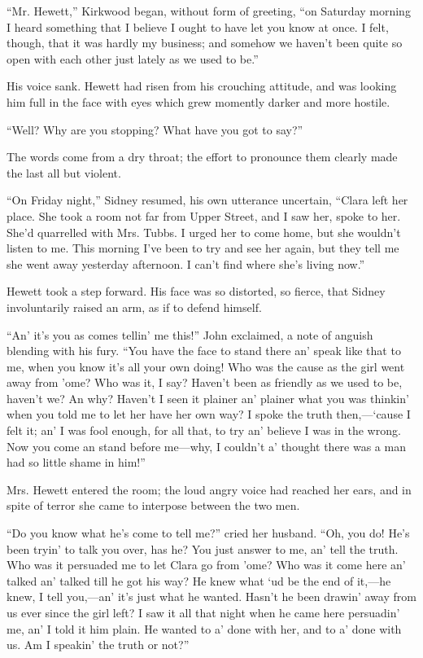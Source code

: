 ``Mr. Hewett,'' Kirkwood began, without form of greeting, ``on Saturday
morning I heard something that I believe I ought to have let you know at
once. I felt, though, that it was hardly my business; and somehow we
haven't been quite so open with each other just lately as we used to
be.''

His voice sank. Hewett had risen from his crouching attitude, and was
looking him full in the face with eyes which grew momently darker and
more hostile.

{}``Well? Why are you stopping? What have you got to say?''

The words come from a dry throat; the effort to pronounce them clearly
made the last all but violent.

``On Friday night,'' Sidney resumed, his own utterance uncertain,
``Clara left her place. She took a room not far from Upper Street, and I
saw her, spoke to her. She'd quarrelled with Mrs. Tubbs. I urged her to
come home, but she wouldn't listen to me. This morning I've been to try
and see her again, but they tell me she went away yesterday afternoon. I
can't find where she's living now.''

Hewett took a step forward. His face was so distorted, so fierce, that
Sidney involuntarily raised an arm, as if to defend himself.

``An' it's you as comes tellin' me this!'' John exclaimed, a note of
anguish blending with his fury. ``You have the face to stand there an'
speak like that to me, when you know it's all your own doing! Who was
the cause as the girl went away from 'ome? Who was it, I say? Haven't
been as friendly as we {}used to be, haven't we? An why? Haven't I seen
it plainer an' plainer what you was thinkin' when you told me to let her
have her own way? I spoke the truth then,---`cause I felt it; an' I was
fool enough, for all that, to try an' believe I was in the wrong. Now
you come an stand before me---why, I couldn't a' thought there was a man
had so little shame in him!''

Mrs. Hewett entered the room; the loud angry voice had reached her ears,
and in spite of terror she came to interpose between the two men.

``Do you know what he's come to tell me?'' cried her husband. ``Oh, you
do! He's been tryin' to talk you over, has he? You just answer to me,
an' tell the truth. Who was it persuaded me to let Clara go from 'ome?
Who was it come here an' talked an' talked till he got his way? He knew
what `ud be the end of it,---he knew, I tell you,---an' it's just what
he wanted. Hasn't he been drawin' away from us ever since the girl left?
I saw it all that night when he came here persuadin' {}me, an' I told it
him plain. He wanted to a' done with her, and to a' done with us. Am I
speakin' the truth or not?''

